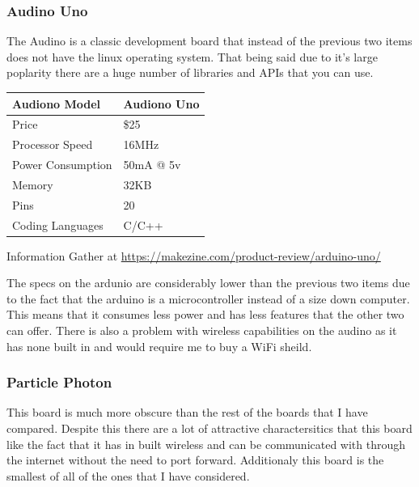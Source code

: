 \documentclass{article}
\begin{document}
\subsubsection{Audino Uno}

The Audino is a classic development board that instead of the previous two items does not have the linux
operating system. That being said due to it's large poplarity there are a huge number of libraries and 
APIs that you can use. \\ 

\begin{tabularx}{\textwidth}{| X | X |}
    \hline
    Audiono Model    &   Audiono Uno \\ \hline
    Price            &       \$25    \\ \hline
    Processor Speed  &      16MHz    \\ \hline
    Power Consumption&    50mA @ 5v  \\ \hline
    Memory           &      32KB     \\ \hline
    Pins             &       20      \\ \hline
    Coding Languages &     C/C++     \\ \hline
\end{tabularx}
\newline

Information Gather at \url{https://makezine.com/product-review/arduino-uno/}


The specs on the ardunio are considerably lower than the previous two items due to the fact that
the arduino is a microcontroller instead of a size down computer. This means that it consumes less
power and has less features that the other two can offer. There is also a problem with wireless
capabilities on the audino as it has none built in and would require me to buy a WiFi sheild.

\subsubsection{Particle Photon}

This board is much more obscure than the rest of the boards that I have compared. Despite this there
are a lot of attractive charactersitics that this board like the fact that it has in built wireless
and can be communicated with through the internet without the need to port forward. Additionaly this
board is the smallest of all of the ones that I have considered. \\
\end{document}
